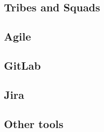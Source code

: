 \subsection{Tribes and Squads}

\subsection{Agile}

\subsection{GitLab}

\subsection{Jira}

\subsection{Other tools}